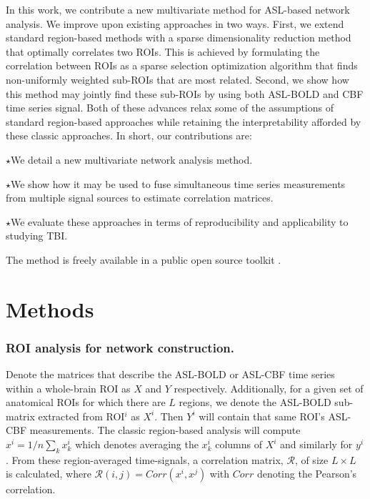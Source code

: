 \documentclass{llncs}
\begin{document}
In this work, we contribute a new multivariate method for ASL-based network analysis.  We improve upon existing approaches in two ways.  First, we extend standard region-based methods with a sparse dimensionality reduction method that optimally correlates two ROIs.  This is achieved by formulating the correlation between ROIs as a sparse selection optimization algorithm that finds non-uniformly weighted sub-ROIs that are most related.  Second, we show how this method may jointly find these sub-ROIs by using both ASL-BOLD and CBF time series signal.  Both of these advances relax some of the assumptions of standard region-based approaches while retaining the interpretability afforded by these classic approaches.  In short, our contributions are: 

\noindent $\star$We detail a new multivariate network analysis method.

\noindent $\star$We show how it may be used to fuse simultaneous time series measurements from multiple signal sources to estimate correlation matrices.

\noindent $\star$We evaluate these approaches in terms of reproducibility and applicability to studying TBI. 

\noindent The method is freely available in a public open source toolkit \cite{anon}.


\section{Methods}
\subsubsection*{ROI analysis for network construction.}
Denote the matrices that describe the ASL-BOLD or ASL-CBF time series within a whole-brain ROI as $X$ and $Y$ respectively.  Additionally, for a given set of anatomical ROIs for which there are $L$ regions, we denote the ASL-BOLD sub-matrix extracted from ROI$^i$ as $X^i$.  Then $Y^i$ will contain that same ROI's ASL-CBF measurements. The classic region-based analysis will compute $x^i = 1/n \sum_k x^i_k$ which denotes averaging the $x^i_k$ columns of $X^i$ and similarly for $y^i$.  From these region-averaged time-signals, a correlation matrix, $\mathcal{R}$, of size $L \times L$ is calculated, where $\mathcal{R}(i,j)=Corr(x^i,x^j)$ with $Corr$ denoting the Pearson's correlation. 
\end{document}
